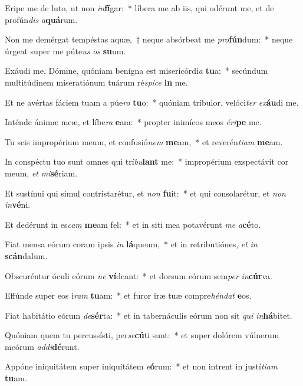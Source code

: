 \item Eripe me de luto, ut non \textit{in}\textbf{fí}gar:~* líbera me ab iis, qui odérunt me, et de profún\textit{dis} \textit{a}\textbf{quá}rum.
\item Non me demérgat tempéstas aquæ,~† neque absórbeat me \textit{pro}\textbf{fún}dum:~* neque úrgeat super me púte\textit{us} \textit{os} \textbf{su}um.
\item Exáudi me, Dómine, quóniam benígna est misericórdi\textit{a} \textbf{tu}a:~* secúndum multitúdinem miseratiónum tuárum ré\textit{spi}\textit{ce} \textbf{in} me.
\item Et ne avértas fáciem tuam a púe\textit{ro} \textbf{tu}o:~* quóniam tríbulor, velóci\textit{ter} \textit{ex}\textbf{áu}di me.
\item Inténde ánimæ meæ, et líbe\textit{ra} \textbf{e}am:~* propter inimícos meos \textit{é}\textit{ri}\textbf{pe} me.
\item Tu scis impropérium meum, et confusió\textit{nem} \textbf{me}am,~* et reverén\textit{ti}\textit{am} \textbf{me}am.
\item In conspéctu tuo sunt omnes qui trí\textit{bu}\textbf{lant} me:~* impropérium exspectávit cor meum, \textit{et} \textit{mi}\textbf{sé}riam.
\item Et sustínui qui simul contristarétur, et \textit{non} \textbf{fu}it:~* et qui consolarétur, et \textit{non} \textit{in}\textbf{vé}ni.
\item Et dedérunt in es\textit{cam} \textbf{me}am fel:~* et in siti mea potavérunt \textit{me} \textit{a}\textbf{cé}to.
\item Fiat mensa eórum coram ipsis \textit{in} \textbf{lá}queum,~* et in retributiónes, \textit{et} \textit{in} \textbf{scán}dalum.
\item Obscuréntur óculi eórum \textit{ne} \textbf{ví}deant:~* et dorsum eórum sem\textit{per} \textit{in}\textbf{cúr}va.
\item Effúnde super eos i\textit{ram} \textbf{tu}am:~* et furor iræ tuæ compre\textit{hén}\textit{dat} \textbf{e}os.
\item Fiat habitátio eórum \textit{de}\textbf{sér}ta:~* et in tabernáculis eórum non sit \textit{qui} \textit{in}\textbf{há}bitet.
\item Quóniam quem tu percussísti, per\textit{se}\textbf{cú}ti sunt:~* et super dolórem vúlnerum meórum \textit{ad}\textit{di}\textbf{dé}runt.
\item Appóne iniquitátem super iniquitátem \textit{e}\textbf{ó}rum:~* et non intrent in justí\textit{ti}\textit{am} \textbf{tu}am.
